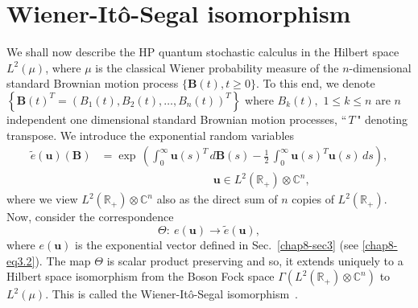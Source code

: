 \section{Wiener-It\^{o}-Segal isomorphism}\label{chap8-sec5}

We shall now describe the HP quantum stochastic calculus in the Hilbert space $L^2(\mu)$, where $\mu$ is the classical Wiener  probability measure of the $n$-dimensional standard Brownian motion process $\{\mathbf{B}(t), t\geq 0\}$. To this end, we denote 
$\left\{\mathbf{B}(t)^T=\left(B_1(t), B_2(t),\ldots , B_n(t)\right)^T\right\}$ where $B_k(t),$ $1\leq k\leq n$ are $n$ independent one dimensional standard Brownian motion processes, ``$\,T\,$" denoting transpose. We introduce the exponential random variables 
\begin{align} 
\widetilde{e}(\mathbf{u})(\mathbf{B})& = {\exp}\,\left( \int_0^\infty \mathbf{u}(s)^T\, d\mathbf{B}(s)- 
\frac{1}{2}\,\int_0^\infty \mathbf{u}(s)^T\mathbf{u}(s)\, ds\right),\nonumber \\ 
& \qquad \qquad \qquad \qquad \qquad \mathbf{u}\in L^2(\mathbb{R}_+)\otimes\mathbb{C}^n, \label{chap8-eq5.1}
\end{align}         
where we view $L^2(\mathbb{R}_+)\otimes \mathbb{C}^n$ also as the direct sum of $n$ copies of $L^2(\mathbb{R}_+).$  
Now, consider the correspondence 
$$
\Theta :\ e(\mathbf{u}) \rightarrow \widetilde{e}(\mathbf{u}),
$$
where $e(\mathbf{u})$ is the exponential vector  defined in Sec.\ \ref{chap8-sec3} (see \eqref{chap8-eq3.2}). The map $\Theta$ is scalar product preserving and so, it extends uniquely to a Hilbert space isomorphism from the Boson Fock space $\Gamma(L^2(\mathbb{R}_+)\otimes\mathbb{C}^n)$ to  $L^2(\mu)$. This is called the Wiener-It\^{o}-Segal isomorphism~\cite{chap8-key32,chap8-key33,chap8-key34}. 

